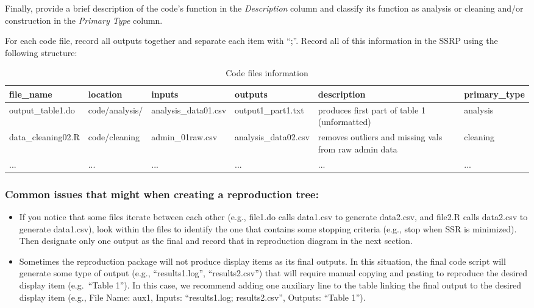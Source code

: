 \documentclass[
]{book}
\begin{document}
Finally, provide a brief description of the code's function in the \emph{Description} column and classify its function as analysis or cleaning and/or construction in the \emph{Primary Type} column.

For each code file, record all outputs together and separate each item with ``;''. Record all of this information in the SSRP using the following structure:

\begin{table}

\caption{\label{tab:code-files-information}Code files information}
\centering
\begin{tabu} to 
\hline
file\_name & location & inputs & outputs & description & primary\_type\\
\hline
output\_table1.do & code/analysis/ & analysis\_data01.csv & output1\_part1.txt & produces first part of table 1 (unformatted) & analysis\\
\hline
data\_cleaning02.R & code/cleaning & admin\_01raw.csv & analysis\_data02.csv & removes outliers and missing vals from raw admin data & cleaning\\
\hline
... & ... & ... & ... & ... & ...\\
\hline
\end{tabu}
\end{table}

\hypertarget{common-issues-that-might-when-creating-a-reproduction-tree}{%
\subsubsection{Common issues that might when creating a reproduction tree:}\label{common-issues-that-might-when-creating-a-reproduction-tree}}

\begin{itemize}
\item
  If you notice that some files iterate between each other (e.g., file1.do calls data1.csv to generate data2.csv, and file2.R calls data2.csv to generate data1.csv), look within the files to identify the one that contains some stopping criteria (e.g., stop when SSR is minimized). Then designate only one output as the final and record that in reproduction diagram in the next section.
\item
  Sometimes the reproduction package will not produce display items as its final outputs. In this situation, the final code script will generate some type of output (e.g., ``results1.log'', ``results2.csv'') that will require manual copying and pasting to reproduce the desired display item (e.g.~``Table 1''). In this case, we recommend adding one auxiliary line to the table linking the final output to the desired display item (e.g., File Name: aux1, Inputs: ``results1.log; results2.csv'', Outputs: ``Table 1'').
\end{itemize}
\end{document}
